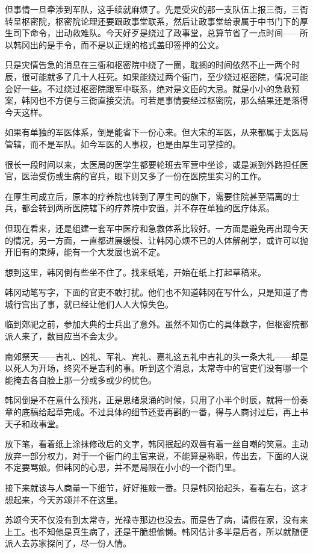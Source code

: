 但事情一旦牵涉到军队，这手续就麻烦了。先是受灾的那一支队伍上报三衙，三衙转呈枢密院，枢密院论理还要跟政事堂联系，然后让政事堂给隶属于中书门下的厚生司下命令，出动救难队。今天好歹是绕过了政事堂，总算节省了一点时间——所以韩冈出的是手令，而不是以正规的格式盖印签押的公文。

只是灾情告急的消息在三衙和枢密院中绕了一圈，耽搁的时间依然不止一两个时辰，很可能就多了几十人枉死。如果能绕过两个衙门，至少绕过枢密院，情况可能会好一些。不过绕过枢密院跟军中联系，绝对是文臣的大忌。就是小小的急救预案，韩冈也不方便与三衙直接交流。可若是事情要经过枢密院，那么结果还是落得今天这样。

如果有单独的军医体系，倒是能省下一份心来。但大宋的军医，从来都属于太医局管辖，而不是军队。如今军医的人事权，也是由厚生司掌控的。

很长一段时间以来，太医局的医学生都要轮班去军营中坐诊，或是派到外路担任医官，医治受伤或生病的官兵，眼下则又多了一份在医院里实习的工作。

在厚生司成立后，原本的疗养院也转到了厚生司的旗下，需要住院甚至隔离的士兵，都会转到两所医院辖下的疗养院中安置，并不存在单独的医疗体系。

但现在看来，还是组建一套军中医疗和急救体系比较好。一方面是避免再出现今天的情况，另一方面，一直都进展缓慢、让韩冈心烦不已的人体解剖学，或许可以抛开旧有的束缚，能有一个大发展也说不定。

想到这里，韩冈倒有些坐不住了。找来纸笔，开始在纸上打起草稿来。

韩冈动笔写字，下面的官吏不敢打扰。他们也不知道韩冈在写什么，只是知道了青城行宫出了事，就已经让他们人人大惊失色。

临到郊祀之前，参加大典的士兵出了意外。虽然不知伤亡的具体数字，但枢密院都派人来了，数目应当不会太少。

南郊祭天——吉礼、凶礼、军礼、宾礼、嘉礼这五礼中吉礼的头一条大礼——却是以死人为开场，终究不是吉利的事。听到这个消息，太常寺中的官吏们没有哪一个能掩去各自脸上那一分或多或少的忧色。

韩冈倒是不在意什么预兆，正是思绪泉涌的时候，只用了小半个时辰，就将一份奏章的底稿给起草完成。不过具体的细节还要再斟酌一番，得与人商讨过后，再上书天子和政事堂。

放下笔，看着纸上涂抹修改后的文字，韩冈抿起的双唇有着一丝自嘲的笑意。主动放弃一部分权力，对于一个衙门的主官来说，不能算是称职，传出去，下面的人说不定要骂娘。但韩冈的心思，并不是局限在小小的一个衙门里。

接下来就该与人商量一下细节，好好推敲一番。只是韩冈抬起头，看看左右，这才想起来，今天苏颂并不在这里。

苏颂今天不仅没有到太常寺，光禄寺那边也没去。而是告了病，请假在家，没有来上工。也不知他是真生病了，还是干脆想偷懒。韩冈估计多半是后者，所以就随便派人去苏家探问了，尽一份人情。

